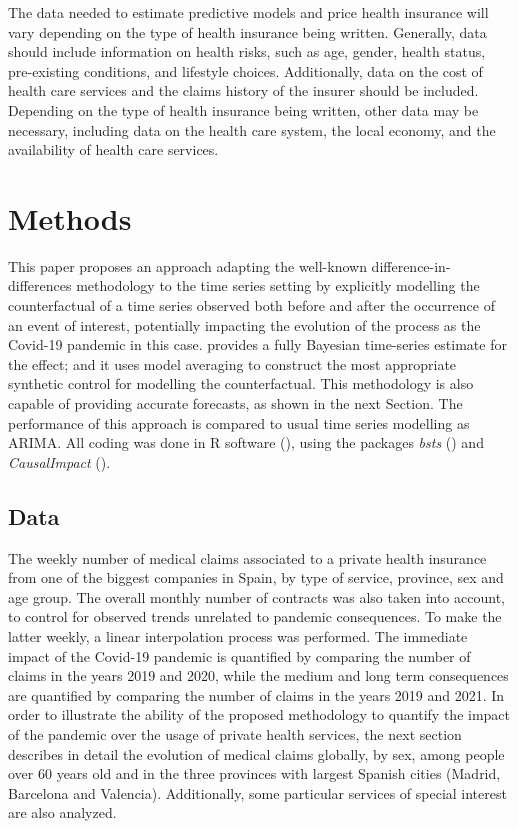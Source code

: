 \documentclass[12pt]{article}
\theoremstyle{definition}
\theoremstyle{remark}
\begin{document}
The data needed to estimate predictive models and price health insurance will vary depending on the type of health insurance being written. Generally, data should include information on health risks, such as age, gender, health status, pre-existing conditions, and lifestyle choices. Additionally, data on the cost of health care services and the claims history of the insurer should be included. Depending on the type of health insurance being written, other data may be necessary, including data on the health care system, the local economy, and the availability of health care services.

\section{Methods}\label{methods}
This paper proposes an approach adapting the well-known difference-in-differences methodology to the time series setting by explicitly modelling the counterfactual of a time series observed both before and after the occurrence of an event of interest, potentially impacting the evolution of the process as the Covid-19 pandemic in this case. provides a fully Bayesian time-series estimate for the effect; and it uses model averaging to construct the most appropriate synthetic control for modelling the counterfactual. This methodology is also capable of providing accurate forecasts, as shown in the next Section. The performance of this approach is compared to usual time series modelling as ARIMA.
All coding was done in R software (\cite{r_core_team_r_2019}), using the packages \textit{bsts} (\cite{scott_predicting_nodate}) and \textit{CausalImpact} (\cite{brodersen_inferring_2015}).

\subsection{Data}\label{data}
The weekly number of medical claims associated to a private health insurance from one of the biggest companies in Spain, by type of service, province, sex and age group. The overall monthly number of contracts was also taken into account, to control for observed trends unrelated to pandemic consequences. To make the latter weekly, a linear interpolation process was performed. The immediate impact of the Covid-19 pandemic is quantified by comparing the number of claims in the years 2019 and 2020, while the medium and long term consequences are quantified by comparing the number of claims in the years 2019 and 2021. In order to illustrate the ability of the proposed methodology to quantify the impact of the pandemic over the usage of private health services, the next section describes in detail the evolution of medical claims globally, by sex, among people over 60 years old and in the three provinces with largest Spanish cities (Madrid, Barcelona and Valencia). Additionally, some particular services of special interest are also analyzed.
\end{document}
